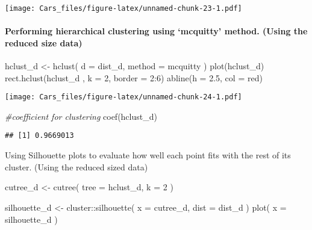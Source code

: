 \documentclass[
]{article}
\newenvironment{Shaded}{\begin{snugshade}}{\end{snugshade}}
\newcommand{\AttributeTok}[1]{\textcolor[rgb]{0.77,0.63,0.00}{#1}}
\newcommand{\CommentTok}[1]{\textcolor[rgb]{0.56,0.35,0.01}{\textit{#1}}}
\newcommand{\DecValTok}[1]{\textcolor[rgb]{0.00,0.00,0.81}{#1}}
\newcommand{\FloatTok}[1]{\textcolor[rgb]{0.00,0.00,0.81}{#1}}
\newcommand{\FunctionTok}[1]{\textcolor[rgb]{0.00,0.00,0.00}{#1}}
\newcommand{\NormalTok}[1]{#1}
\newcommand{\OtherTok}[1]{\textcolor[rgb]{0.56,0.35,0.01}{#1}}
\newcommand{\SpecialCharTok}[1]{\textcolor[rgb]{0.00,0.00,0.00}{#1}}
\newcommand{\StringTok}[1]{\textcolor[rgb]{0.31,0.60,0.02}{#1}}
\begin{document}
\texttt{[image: Cars\_files/figure-latex/unnamed-chunk-23-1.pdf]}

\hypertarget{performing-hierarchical-clustering-using-mcquitty-method.-using-the-reduced-size-data}{%
\paragraph{Performing hierarchical clustering using `mcquitty' method.
(Using the reduced size
data)}\label{performing-hierarchical-clustering-using-mcquitty-method.-using-the-reduced-size-data}}

\begin{Shaded}
\begin{Highlighting}[]
\NormalTok{hclust\_d }\OtherTok{\textless{}{-}} \FunctionTok{hclust}\NormalTok{(}
  \AttributeTok{d =}\NormalTok{ dist\_d,}
  \AttributeTok{method =} \StringTok{\textquotesingle{}mcquitty\textquotesingle{}}
\NormalTok{)}
\FunctionTok{plot}\NormalTok{(hclust\_d)}
\FunctionTok{rect.hclust}\NormalTok{(hclust\_d , }\AttributeTok{k =} \DecValTok{2}\NormalTok{, }\AttributeTok{border =} \DecValTok{2}\SpecialCharTok{:}\DecValTok{6}\NormalTok{)}
\FunctionTok{abline}\NormalTok{(}\AttributeTok{h =} \FloatTok{2.5}\NormalTok{, }\AttributeTok{col =} \StringTok{\textquotesingle{}red\textquotesingle{}}\NormalTok{)}
\end{Highlighting}
\end{Shaded}

\texttt{[image: Cars\_files/figure-latex/unnamed-chunk-24-1.pdf]}

\begin{Shaded}
\begin{Highlighting}[]
\CommentTok{\#coefficient for clustering}
\FunctionTok{coef}\NormalTok{(hclust\_d)}
\end{Highlighting}
\end{Shaded}

\begin{verbatim}
## [1] 0.9669013
\end{verbatim}

Using Silhouette plots to evaluate how well each point fits with the
rest of its cluster. (Using the reduced sized data)

\begin{Shaded}
\begin{Highlighting}[]
\NormalTok{cutree\_d }\OtherTok{\textless{}{-}} \FunctionTok{cutree}\NormalTok{(}
  \AttributeTok{tree =}\NormalTok{ hclust\_d,}
  \AttributeTok{k =} \DecValTok{2}
\NormalTok{)}

\NormalTok{silhouette\_d }\OtherTok{\textless{}{-}}\NormalTok{ cluster}\SpecialCharTok{::}\FunctionTok{silhouette}\NormalTok{(}
  \AttributeTok{x =}\NormalTok{ cutree\_d,}
  \AttributeTok{dist =}\NormalTok{ dist\_d}
\NormalTok{)}
\FunctionTok{plot}\NormalTok{(}
  \AttributeTok{x =}\NormalTok{ silhouette\_d}
\NormalTok{)}
\end{Highlighting}
\end{Shaded}
\end{document}
